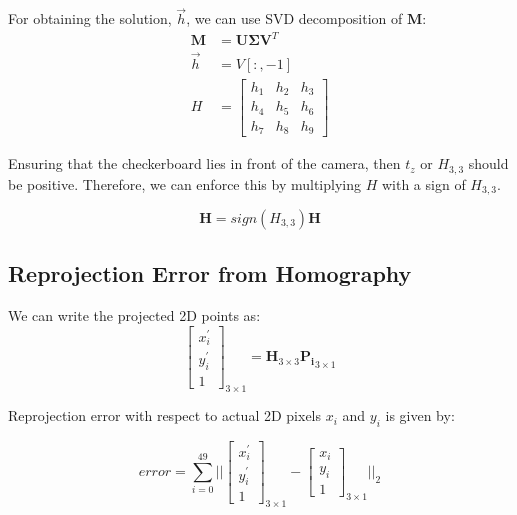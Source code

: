 \documentclass{article}
\begin{document}
For obtaining the solution, $\vec{h}$, we can use SVD decomposition of $\mathbf{M}$:
\begin{align}
    \mathbf{M} &= \mathbf{U} \mathbf{\Sigma} \mathbf{V}^T \\
    \vec{h} &= V[:, -1] \\
    H &= \begin{bmatrix} h_1 & h_2 & h_3 \\ h_4 & h_5 & h_6 \\ h_7 & h_8 & h_9 \end{bmatrix}
\end{align}

Ensuring that the checkerboard lies in front of the camera, then $t_z$ or $H_{3,3}$ should be positive. Therefore, we can enforce this by multiplying $H$ with a sign of $H_{3,3}$.

\begin{equation}
    \mathbf{H} = sign(H_{3,3}) \mathbf{H}
\end{equation}

\subsection{Reprojection Error from Homography}
We can write the projected 2D points as:
\begin{equation}
    \begin{bmatrix}
    x_i^{'} \\ y_i^{'} \\ 1
    \end{bmatrix}_{3 \times 1} = \mathbf{H}_{3 \times 3} \mathbf{P_i}_{3 \times 1}
\end{equation}

Reprojection error with respect to actual 2D pixels $x_i$ and $y_i$ is given by:


\begin{equation}
    error = \sum_{i=0}^{49} || \begin{bmatrix} x_i^{'} \\ y_i^{'} \\ 1 \end{bmatrix}_{3 \times 1} - \begin{bmatrix} x_i \\ y_i \\ 1 \end{bmatrix}_{3 \times 1} ||_2
\end{equation}
\end{document}
